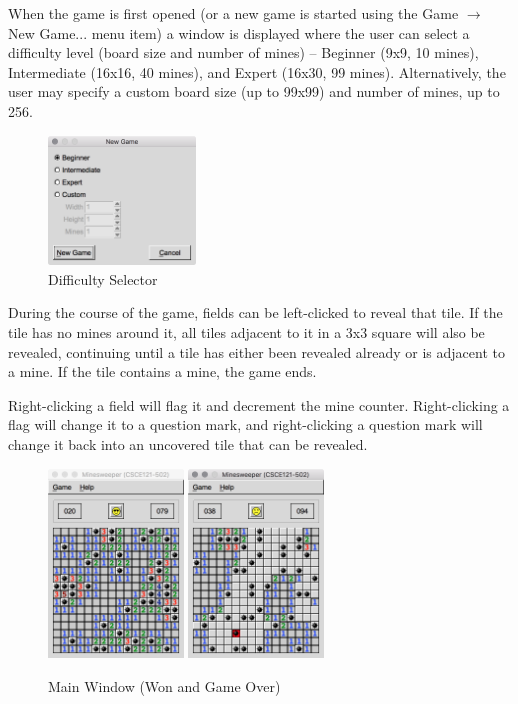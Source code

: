 \documentclass[11pt]{article}
\begin{document}
When the game is first opened (or a new game is started using the Game $\rightarrow$ New Game... menu item) a window is displayed where the user can select a difficulty level (board size and number of mines) -- Beginner (9x9, 10 mines), Intermediate (16x16, 40 mines), and Expert (16x30, 99 mines). Alternatively, the user may specify a custom board size (up to 99x99) and number of mines, up to 256.

\begin{figure}[htbp]
   \centering
   \includegraphics[width=0.35\textwidth]{newGame.png}
   \caption{Difficulty Selector}
\end{figure}

During the course of the game, fields can be left-clicked to reveal that tile. If the tile has no mines around it, all tiles adjacent to it in a 3x3 square will also be revealed, continuing until a tile has either been revealed already or is adjacent to a mine. If the tile contains a mine, the game ends.

Right-clicking a field will flag it and decrement the mine counter. Right-clicking a flag will change it to a question mark, and right-clicking a question mark will change it back into an uncovered tile that can be revealed.

\begin{figure}[htbp]
   \centering
   \includegraphics[width=0.32\textwidth]{mainWon.png}
   \includegraphics[width=0.32\textwidth]{mainGameOver.png}
   \caption{Main Window (Won and Game Over)}
\end{figure}
\end{document}
